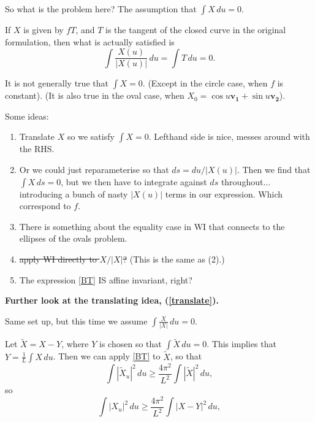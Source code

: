 \documentclass{amsart}
\begin{document}
So what is the problem here?  The assumption that $\int X \,du=0$.   

If $X$ is given by $fT$, and $T$ is the tangent of the closed curve in the original formulation, then what is actually satisfied is 
\begin{equation} \label{tangent of loop} \int \frac{X(u)}{|X(u)|}\,du = \int T \,du= 0.\end{equation}

It is not generally true that $\int X=0$.   (Except in the circle case, when $f$ is constant).   (It is also true in the oval case, when $X_0=\cos u \mathbf{v_1}+ \sin u \mathbf{v_2}$).   

Some ideas:   
\begin{enumerate}
\item Translate $X$ so we satisfy $\int X=0$.  Lefthand side is nice, messes around with the RHS. \label{translate}

\item Or we could just reparameterise so that $ds=du/|X(u)|$.   Then we find that $\int X \,ds=0$, but we then have to integrate against $ds$ throughout... introducing a bunch of nasty $|X(u)|$ terms in our expression.     Which correspond to $f$.

\item There is something about the equality case in WI that connects to the ellipses of the ovals problem.

\item \sout{apply WI directly to $X/|X|$?} (This is the same as (2).)  

\item The expression \eqref{BT} IS affine invariant, right?



\end{enumerate}

\textbf{Further look at the translating idea, (\ref{translate}).}

Same set up, but this time we assume $\int \frac{X}{|X|}\,du=0$. 

Let $\tilde{X}=X-Y$, where $Y$ is chosen so that $\int\tilde{X}\, du=0$.    This implies that $Y=\frac1L\int X \,du$.    Then we can apply \eqref{BT} to $\tilde{X}$, so that 
\[  \int |\tilde{X}_u|^2 \,du \ge \frac{4\pi^2}{L^2}\int |\tilde{X}|^2\,du , \]
so
\begin{equation} \int |{X}_u|^2 \,du \ge \frac{4\pi^2}{L^2}\int |{X}-Y|^2\,du , \label{tildy}\end{equation}
\end{document}
